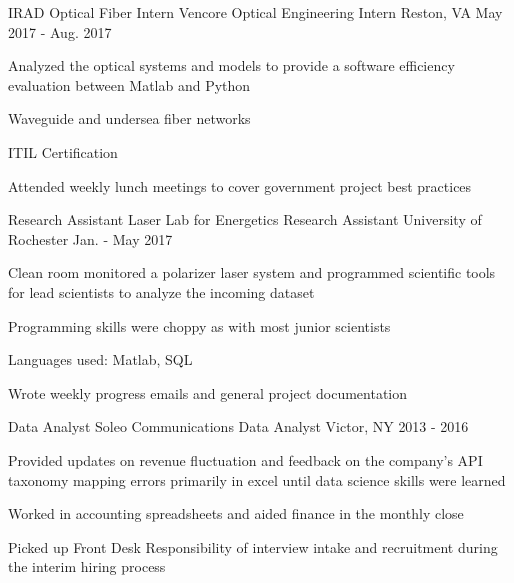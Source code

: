 \begin{cventries}
  \cventry
    {IRAD Optical Fiber Intern}
    {Vencore Optical Engineering Intern}
    {Reston, VA}
    {May 2017 - Aug. 2017}
    {
      \begin{cvitems}
        \item {Analyzed the optical systems and models to provide a software efficiency evaluation between Matlab and Python}
        \item{Waveguide and undersea fiber networks}
        \item {ITIL Certification}
        \item {Attended weekly lunch meetings to cover government project best practices}
      \end{cvitems}
    }
  \cventry
    {Research Assistant}
    {Laser Lab for Energetics Research Assistant}
    {University of Rochester}
    {Jan. - May 2017}
    {
      \begin{cvitems}
        \item {Clean room monitored a polarizer laser system and programmed scientific tools for lead scientists to analyze the incoming dataset}
        \item{Programming skills were choppy as with most junior scientists}
        \item {Languages used: Matlab, SQL}
        \item {Wrote weekly progress emails and general project documentation}
      \end{cvitems}
    }
  \cventry
    {Data Analyst}
    {Soleo Communications Data Analyst}
    {Victor, NY}
    {2013 - 2016}
    {
      \begin{cvitems}
        \item {Provided updates on revenue fluctuation and feedback on the company's API taxonomy mapping errors primarily in excel until data science skills were learned}
        \item{Worked in accounting spreadsheets and aided finance in the monthly close}
        \item{Picked up Front Desk Responsibility of interview intake and recruitment during the interim hiring process}
      \end{cvitems}
    }    
\end{cventries}
